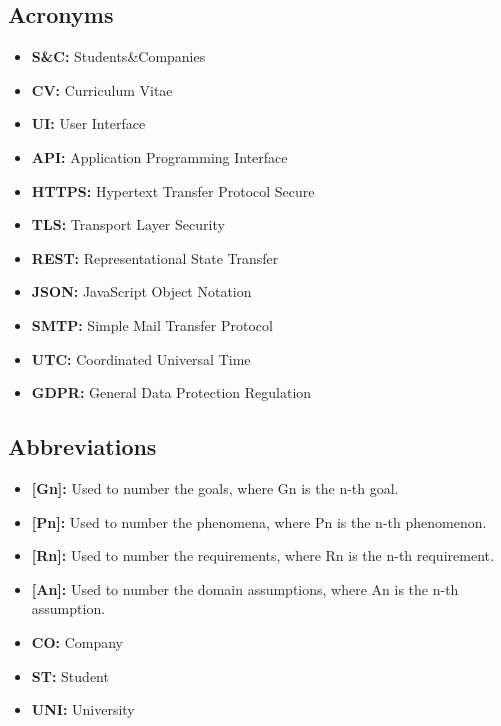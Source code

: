 \subsection{Acronyms}\label{subsec:acronyms}
\begin{itemize}
    \item \textbf{S\&C:} Students\&Companies
    \item \textbf{CV:} Curriculum Vitae
    \item \textbf{UI:} User Interface
    \item \textbf{API:} Application Programming Interface
    \item \textbf{HTTPS:} Hypertext Transfer Protocol Secure
    \item \textbf{TLS:} Transport Layer Security
    \item \textbf{REST:} Representational State Transfer
    \item \textbf{JSON:} JavaScript Object Notation
    \item \textbf{SMTP:} Simple Mail Transfer Protocol
    \item \textbf{UTC:} Coordinated Universal Time
    \item \textbf{GDPR:} General Data Protection Regulation

\end{itemize}

\subsection{Abbreviations}\label{subsec:abbreviations}
\begin{itemize}
    \item \textbf{[Gn]:} Used to number the goals, where Gn is the n-th goal.
    \item \textbf{[Pn]:} Used to number the phenomena, where Pn is the n-th phenomenon.
    \item \textbf{[Rn]:} Used to number the requirements, where Rn is the n-th requirement.
    \item \textbf{[An]:} Used to number the domain assumptions, where An is the n-th assumption.
    \item \textbf{CO:} Company
    \item \textbf{ST:} Student
    \item \textbf{UNI:} University
\end{itemize}

